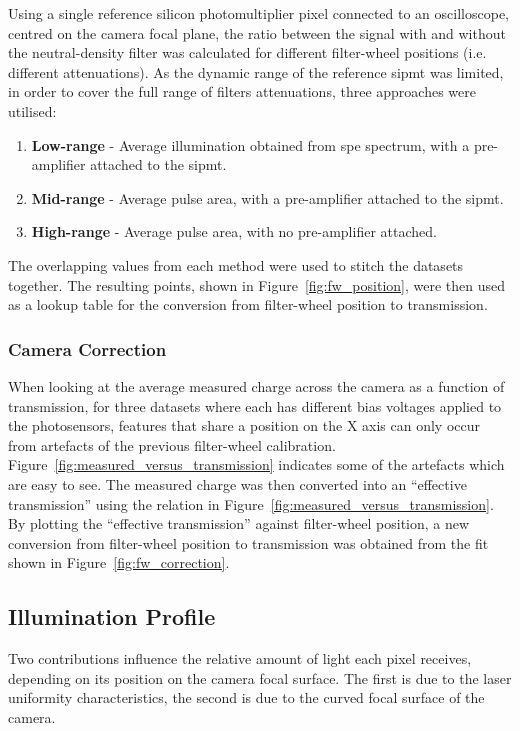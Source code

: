 Using a single reference silicon photomultiplier pixel connected to an oscilloscope, centred on the camera focal plane, the ratio between the signal with and without the neutral-density filter was calculated for different filter-wheel positions (i.e. different attenuations). As the dynamic range of the reference \gls{sipmt} was limited, in order to cover the full range of filters attenuations, three approaches were utilised:
\begin{enumerate}
\item \textbf{Low-range} - Average illumination obtained from \gls{spe} spectrum, with a pre-amplifier attached to the \gls{sipmt}.
\item \textbf{Mid-range} - Average pulse area, with a pre-amplifier attached to the \gls{sipmt}.
\item \textbf{High-range} - Average pulse area, with no pre-amplifier attached.
\end{enumerate}
The overlapping values from each method were used to stitch the datasets together. The resulting points, shown in Figure~\ref{fig:fw_position}, were then used as a lookup table for the conversion from filter-wheel position to transmission.

\subsubsection{Camera Correction}

When looking at the average measured charge across the camera as a function of transmission, for three datasets where each has different bias voltages applied to the photosensors, features that share a position on the X axis can only occur from artefacts of the previous filter-wheel calibration. Figure~\ref{fig:measured_versus_transmission} indicates some of the artefacts which are easy to see. The measured charge was then converted into an ``effective transmission'' using the relation in Figure~\ref{fig:measured_versus_transmission}. By plotting the ``effective transmission'' against filter-wheel position, a new conversion from filter-wheel position to transmission was obtained from the fit shown in Figure~\ref{fig:fw_correction}.

\subsection{Illumination Profile} \label{section:illumination_profile}

Two contributions influence the relative amount of light each pixel receives, depending on its position on the camera focal surface. The first is due to the laser uniformity characteristics, the second is due to the curved focal surface of the camera.

